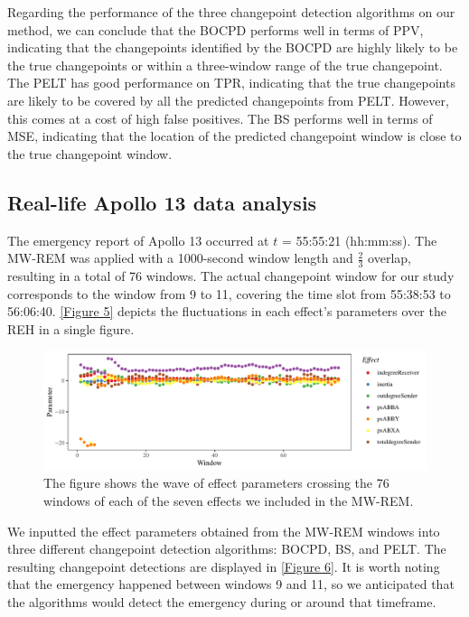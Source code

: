 \documentclass[]{interact}
\theoremstyle{plain}%
\theoremstyle{definition}
\theoremstyle{remark}
\begin{document}
{    Regarding the performance of the three changepoint detection algorithms on our method, we can conclude that the BOCPD performs well in terms of PPV, indicating that the changepoints identified by the BOCPD are highly likely to be the true changepoints or within a three-window range of the true changepoint. The PELT has good performance on TPR, indicating that the true changepoints are likely to be covered by all the predicted changepoints from PELT. However, this comes at a cost of high false positives. The BS performs well in terms of MSE, indicating that the location of the predicted changepoint window is close to the true changepoint window.
    
	\subsection{Real-life Apollo 13 data analysis}
	
	\hspace{0.28cm} The emergency report of Apollo 13 occurred at $t$ = 55:55:21 (hh:mm:ss). The MW-REM was applied with a 1000-second window length and $\frac{2}{3}$ overlap, resulting in a total of 76 windows. The actual changepoint window for our study corresponds to the window from 9 to 11, covering the time slot from 55:38:53 to 56:06:40. \autoref{Figure 5} depicts the fluctuations in each effect's parameters over the REH in a single figure. \\
	
    \begin{figure}[h]
    	\captionsetup{justification=raggedright}
    	\renewcommand{\figurename}{Figure}
    	\centering
    	\includegraphics[width=\textwidth,height=\textheight,keepaspectratio]{Apollo_effects}
    	\caption{\fontsize{8}{10}\selectfont The figure shows the wave of effect parameters crossing the 76 windows of each of the seven effects we included in the MW-REM.}
    	\label{Figure 5}
    \end{figure}
	
	We inputted the effect parameters obtained from the MW-REM windows into three different changepoint detection algorithms: BOCPD, BS, and PELT. The resulting changepoint detections are displayed in \autoref{Figure 6}. It is worth noting that the emergency happened between windows 9 and 11, so we anticipated that the algorithms would detect the emergency during or around that timeframe. \\
	
}
\end{document}
